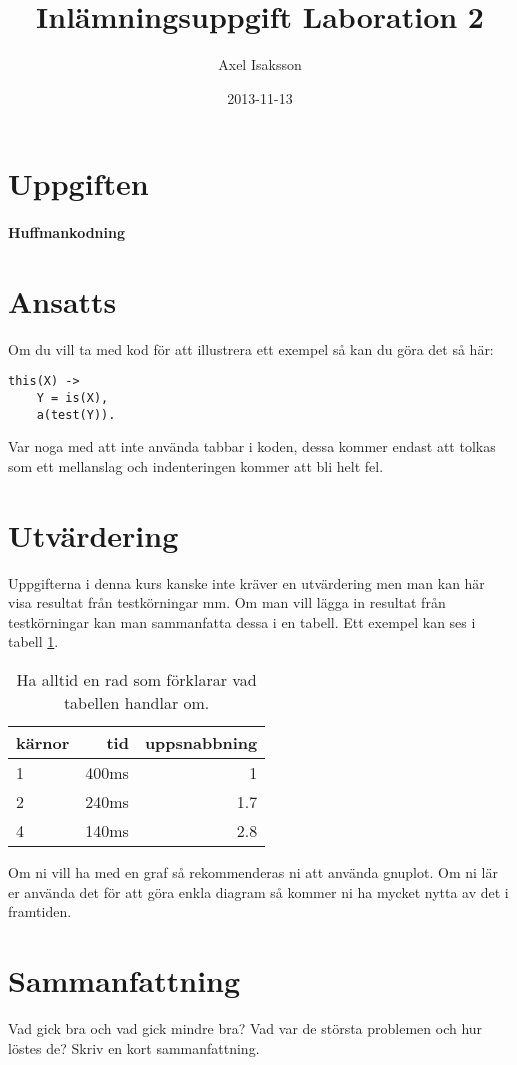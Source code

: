 \documentclass[a4paper, 11pt]{article}
\title{Inlämningsuppgift Laboration 2}
\author{Axel Isaksson}
\date{2013-11-13}
\begin{document}
\maketitle 

\section{Uppgiften}

\paragraph{Huffmankodning}


\section{Ansatts}

Om du vill ta med kod för att illustrera ett exempel så kan du göra det så här:

\begin{verbatim}
this(X) ->
    Y = is(X),
    a(test(Y)).
\end{verbatim}

Var noga med att inte använda tabbar i koden, dessa kommer endast att
tolkas som ett mellanslag och indenteringen kommer att bli helt fel. 

\section{Utvärdering}

Uppgifterna i denna kurs kanske inte kräver en utvärdering men man kan
här visa resultat från testkörningar mm. Om man vill lägga in resultat
från testkörningar kan man sammanfatta dessa i en tabell. Ett exempel
kan ses i tabell \ref{tab:results}. 


\begin{table}
\centering
\begin{tabular}{|l|r|r|}  
\hline
kärnor & tid & uppsnabbning\\
\hline
1 & 400ms & 1\\
\hline
2 & 240ms & 1.7\\
\hline
4 & 140ms & 2.8\\
\hline
\end{tabular}
\caption{Ha alltid en rad som förklarar vad tabellen handlar om.}
\label{tab:results}
\end{table}

Om ni vill ha med en graf så rekommenderas ni att använda gnuplot. Om
ni lär er använda det för att göra enkla diagram så kommer ni ha
mycket nytta av det i framtiden.


\section{Sammanfattning}

Vad gick bra och vad gick mindre bra? Vad var de största problemen och
hur löstes de? Skriv en kort sammanfattning.
\end{document}
